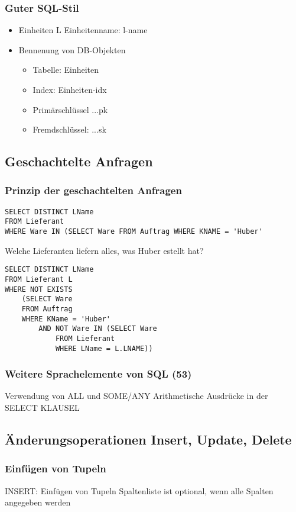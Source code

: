 \subsubsection{Guter SQL-Stil}
\begin{itemize}
	\item Einheiten L Einheitenname: l-name
	\item Bennenung von DB-Objekten
	\begin{itemize}
		\item Tabelle: Einheiten
		\item Index: Einheiten-idx
		\item Primärschlüssel ...pk
		\item Fremdschlüssel: ...sk
	\end{itemize}
\end{itemize}
\subsection{Geschachtelte Anfragen}
\subsubsection{Prinzip der geschachtelten Anfragen}
\begin{lstlisting}
SELECT DISTINCT LName
FROM Lieferant
WHERE Ware IN (SELECT Ware FROM Auftrag WHERE KNAME = 'Huber'
\end{lstlisting}
Welche Lieferanten liefern alles, was Huber estellt hat?
\begin{lstlisting}
SELECT DISTINCT LName
FROM Lieferant L
WHERE NOT EXISTS 
	(SELECT Ware
	FROM Auftrag
	WHERE KName = 'Huber'
		AND NOT Ware IN (SELECT Ware
			FROM Lieferant
			WHERE LName = L.LNAME))
\end{lstlisting}
\subsubsection{Weitere Sprachelemente von SQL (53)}
Verwendung von ALL und SOME/ANY
Arithmetische Ausdrücke in der SELECT KLAUSEL
\subsection{Änderungsoperationen Insert, Update, Delete}
\subsubsection{Einfügen von Tupeln}
INSERT: Einfügen von Tupeln
Spaltenliste ist optional, wenn alle Spalten angegeben werden
